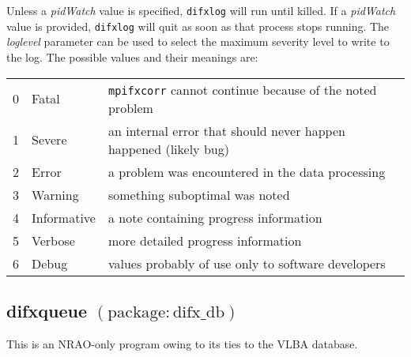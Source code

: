 Unless a {\em pidWatch} value is specified, {\tt difxlog} will run until killed.
If a {\em pidWatch} value is provided, {\tt difxlog} will quit as soon as that process stops running.
The {\em loglevel} parameter can be used to select the maximum severity level to write to the log.
The possible values and their meanings are:
\begin{center}
\begin{tabular}{lll}
0 & Fatal & {\tt mpifxcorr} cannot continue because of the noted problem \\
1 & Severe & an internal error that should never happen happened (likely bug) \\
2 & Error & a problem was encountered in the data processing \\
3 & Warning & something suboptimal was noted \\
4 & Informative & a note containing progress information \\
5 & Verbose & more detailed progress information \\
6 & Debug & values probably of use only to software developers \\
\end{tabular}
\end{center}








\subsection{difxqueue {\small $\mathrm{(package: difx\_db)}$}} \label{sec:difxqueue}


This is an NRAO-only program owing to its ties to the VLBA database.

